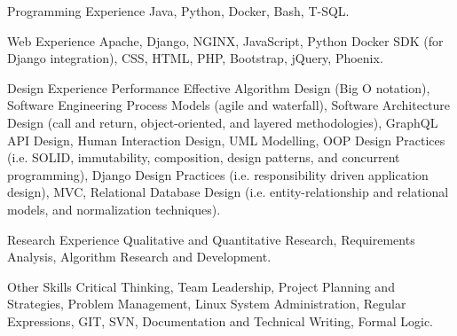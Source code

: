 \begin{cvskills}

  \cvskill
    {Programming Experience} %
    {Java, Python, Docker, Bash, T-SQL.} %

  \cvskill
    {Web Experience} %
    {Apache, Django, NGINX, JavaScript, Python Docker SDK (for Django integration), CSS, HTML, PHP, Bootstrap, jQuery, Phoenix.} %

  \cvskill
    {Design Experience} %
    {Performance Effective Algorithm Design (Big O notation), Software Engineering Process Models (agile and waterfall), Software Architecture Design (call and return, object-oriented, and layered methodologies), GraphQL API Design, Human Interaction Design, UML Modelling, OOP Design Practices (i.e. SOLID, immutability, composition, design patterns, and concurrent programming), Django Design Practices (i.e. responsibility driven application design), MVC, Relational Database Design (i.e. entity-relationship and relational models, and normalization techniques).} %

  \cvskill
    {Research Experience} %
    {Qualitative and Quantitative Research, Requirements Analysis, Algorithm Research and Development.} %

  \cvskill
    {Other Skills} %
    {Critical Thinking, Team Leadership, Project Planning and Strategies, Problem Management, Linux System Administration, Regular Expressions, GIT, SVN, Documentation and Technical Writing, Formal Logic.} %

\end{cvskills}